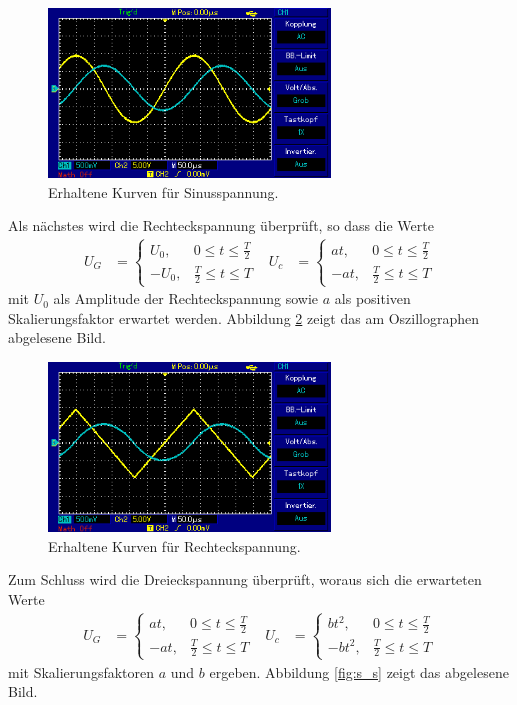 \begin{figure}[H]
  \centering
  \includegraphics[height=4.5cm]{oz5.png}
  \caption{Erhaltene Kurven für Sinusspannung.}
  \label{fig:sin_r}
\end{figure}


Als nächstes wird die Rechteckspannung überprüft, so dass die Werte
\begin{align}
  U_G &=
  \begin{cases}
    U_0 , &  0 \leq t \leq \frac{T}{2} \\
    -U_0 , & \frac{T}{2} \leq t \leq T
  \end{cases}
   & U_c &=
  \begin{cases}
    at , &  0 \leq t \leq \frac{T}{2} \\
    -at , & \frac{T}{2} \leq t \leq T
  \end{cases}
\end{align}
mit $U_0$ als Amplitude der Rechteckspannung sowie $a$ als positiven Skalierungsfaktor erwartet werden.
Abbildung \ref{fig:rechteck_s} zeigt das am Oszillographen abgelesene Bild.

\begin{figure}[H]
  \centering
  \includegraphics[height=4.5cm]{oz6.png}
  \caption{Erhaltene Kurven für Rechteckspannung.}
  \label{fig:rechteck_s}
\end{figure}

Zum Schluss wird die Dreieckspannung überprüft, woraus sich die erwarteten Werte
\begin{align}
  U_G &=
  \begin{cases}
    at , &  0 \leq t \leq \frac{T}{2} \\
    -at , & \frac{T}{2} \leq t \leq T
  \end{cases}
  & U_c &=
  \begin{cases}
    b t^2 , &  0 \leq t \leq \frac{T}{2} \\
    -b t^2 , & \frac{T}{2} \leq t \leq T
  \end{cases}
\end{align}
mit Skalierungsfaktoren $a$ und $b$ ergeben.
Abbildung \ref{fig:s_s} zeigt das abgelesene Bild.

